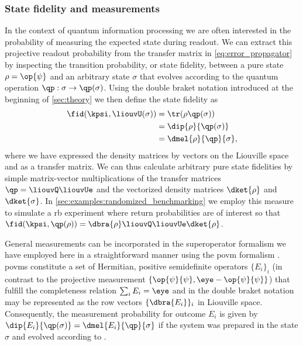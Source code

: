 \subsubsection{State fidelity and measurements}\label{sec:theory:derived_quantities:state_fidelity-measurements}
In the context of quantum information processing we are often interested in the probability of measuring the expected state during readout. We can extract this projective readout probability from the transfer matrix in \cref{eq:error_propagator} by inspecting the transition probability, or state fidelity, between a pure state $\rho = \op{\psi}$ and an arbitrary state $\sigma$ that evolves according to the quantum operation $\qp: \sigma\rightarrow\qp(\sigma)$. Using the double braket notation introduced at the beginning of \cref{sec:theory} we then define the state fidelity as
\begin{equation}\label{eq:fidelity:state}
\begin{split}
    \fid(\kpsi, \liouvU(\sigma)) &= \tr(\rho\qp(\sigma)) \\
                               &= \dip{\rho}{\qp(\sigma)} \\
                               & =  \dmel{\rho}{\qp}{\sigma},
\end{split}
\end{equation}
where we have expressed the density matrices by vectors on the Liouville space \Lspace and \qp as a transfer matrix. We can thus calculate arbitrary pure state fidelities by simple matrix-vector multiplications of the transfer matrices $\qp = \liouvQ\liouvUe$ and the vectorized density matrices $\dket{\rho}$ and $\dket{\sigma}$. In \cref{sec:examples:randomized_benchmarking} we employ this measure to simulate a \gls{rb} experiment where return probabilities are of interest so that $\fid(\kpsi, \qp(\rho)) = \dbra{\rho}\liouvQ\liouvUe\dket{\rho}$.

General measurements can be incorporated in the superoperator formalism we have employed here in a straightforward manner using the \gls{povm} formalism \cite{Wallman2014,Greenbaum2015}. \Glspl{povm} constitute a set of Hermitian, positive semidefinite operators $\lbrace E_i\rbrace_i$ (in contrast to the projective measurement $\lbrace\op{\psi}{\psi},\eye - \op{\psi}{\psi}\rbrace$) that fulfill the completeness relation $\sum_i E_i = \eye$ and in the double braket notation may be represented as the row vectors $\lbrace\dbra{E_i}\rbrace_i$ in Liouville space. Consequently, the measurement probability for outcome $E_i$ is given by $\dip{E_i}{\qp(\sigma)} = \dmel{E_i}{\qp}{\sigma}$ if the system was prepared in the state $\sigma$ and evolved according to \qp.

